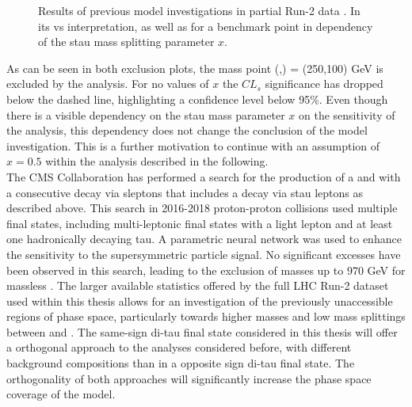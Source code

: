 \begin{figure}[htpb!]
\centering
{}
\caption{Results of previous model investigations in partial Run-2 data \cite{DiTauC1N2_2018} \label{fig:analysis:previousresults}. In its \Mnone vs \Mntwo interpretation,  as well as for a benchmark point in dependency of the stau mass splitting parameter $x$. }
\end{figure}

As can be seen in both exclusion plots,  the mass point (\Ntwo,\None) = (250,100) GeV is excluded by the analysis.  For no values of $x$ the $CL_s$ significance has dropped below the dashed line,  highlighting a confidence level below 95\%.  
Even though there is a visible dependency on the stau mass parameter $x$ on the sensitivity of the analysis,  this dependency does not change the conclusion of the model investigation. This is a further motivation to continue with an assumption of $x = 0.5$ within the analysis described in the following.  \\
The \acs{CMS} Collaboration has performed a search for the production of a \Cone and \Ntwo with a consecutive decay via sleptons \cite{CMSDitauGaugino} that includes a decay via stau leptons as described above. This search in 2016-2018 proton-proton collisions used multiple final states,  including multi-leptonic final states with a light lepton and at least one hadronically decaying tau.  A parametric neural network was used to enhance the sensitivity to the supersymmetric particle signal. No significant excesses have been observed in this search,  leading to the exclusion of \Ntwo masses up to 970 GeV for massless \None. 
The larger available statistics offered by the full LHC Run-2 dataset used within this thesis allows for an investigation of the previously unaccessible regions of phase space,  particularly towards higher \Cone masses and low mass splittings between \Cone and \Ntwo. The same-sign di-tau final state considered in this thesis will offer a orthogonal approach to the analyses considered before, with different background compositions than in a opposite sign di-tau final state.  The orthogonality of both approaches will significantly increase the phase space coverage of the model. %

